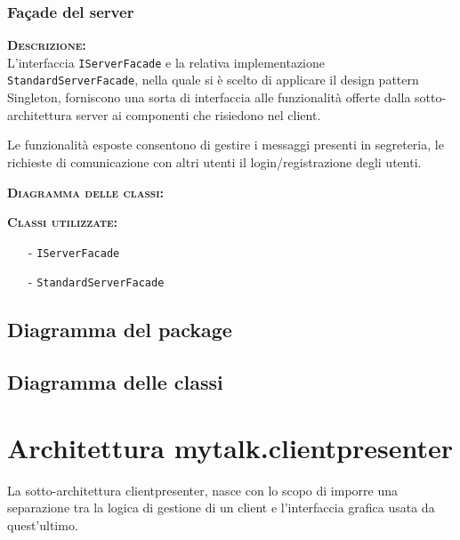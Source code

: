 \subsubsection{Façade del server}
\begin{description}
	\item{\scshape\bfseries Descrizione:}\\
L'interfaccia \texttt{IServerFacade} e la relativa implementazione \texttt{StandardServerFacade}, nella quale si è scelto di applicare il design pattern Singleton, forniscono una sorta di interfaccia alle funzionalità offerte dalla sotto-architettura server ai componenti che risiedono nel client.

Le funzionalità esposte consentono di gestire i messaggi presenti in segreteria, le richieste di comunicazione con altri utenti il login/registrazione degli utenti.
	\item{\scshape\bfseries Diagramma delle classi:}
	\item{\scshape\bfseries Classi utilizzate:}\\
	\begin{itemize}[noitemsep,nolistsep]
	  \item[-] \texttt{IServerFacade}
	  \item[-] \texttt{StandardServerFacade}
	\end{itemize}
\end{description}

\subsection{Diagramma del package}

\subsection{Diagramma delle classi}
\clearpage

\section{Architettura mytalk.clientpresenter}
La sotto-architettura clientpresenter, nasce con lo scopo di imporre una separazione tra la logica di gestione di un client e l'interfaccia grafica usata da quest'ultimo.

